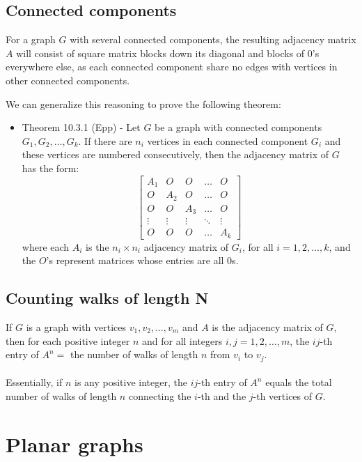 \documentclass[a4paper]{article}
\begin{document}
\subsection{Connected components}
For a graph $G$ with several connected components, the resulting adjacency matrix $A$ will consist of square matrix blocks down its diagonal and blocks of 0's everywhere else, as each connected component share no edges with vertices in other connected components.

We can generalize this reasoning to prove the following theorem:
\begin{itemize}
	\item[] Theorem 10.3.1 (Epp) - Let $G$ be a graph with connected components $G_1, G_2,\dots,G_k$. If there are $n_i$ vertices in each connected component $G_i$ and these vertices are numbered consecutively, then the adjacency matrix of $G$ has the form:
	\[
	\begin{bmatrix}
		A_1 & O & O & \dots  & O \\
		O & A_2 & O & \dots  & O \\
		O & O & A_3 & \dots  & O \\
		\vdots & \vdots & \vdots & \ddots & \vdots \\
		O & O & O & \dots  & A_k
	\end{bmatrix}
	\]
	where each $A_i$ is the $n_i\times n_i$ adjacency matrix of $G_i$, for all $i=1,2,\dots,k$, and the $O$'s represent matrices whose entries are all 0s.
\end{itemize}

\subsection{Counting walks of length N}
If $G$ is a graph with vertices $v_1, v_2, \dots,v_m$ and $A$ is the adjacency matrix of $G$, then for each positive integer $n$ and for all integers $i,j=1,2,\dots,m$, the $ij$-th entry of $A^n =$ the number of walks of length $n$ from $v_i$ to $v_j$.\\\\
Essentially, if $n$ is any positive integer, the $ij$-th entry of $A^n$ equals the total number of walks of length $n$ connecting the $i$-th and the $j$-th vertices of $G$.

\section{Planar graphs}
\end{document}
